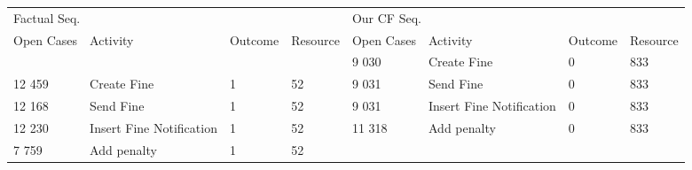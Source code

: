 \begin{tabular}{llllllll}
\toprule
\multicolumn{4}{l}{Factual Seq.} & \multicolumn{4}{l}{Our CF Seq.} \\
Open Cases & Activity & Outcome & Resource & Open Cases & Activity & Outcome & Resource \\
\midrule
 &  &  &  & 9 030 & Create Fine & 0 & 833 \\
12 459 & Create Fine & 1 & 52 & 9 031 & Send Fine & 0 & 833 \\
12 168 & Send Fine & 1 & 52 & 9 031 & Insert Fine Notification & 0 & 833 \\
12 230 & Insert Fine Notification & 1 & 52 & 11 318 & Add penalty & 0 & 833 \\
7 759 & Add penalty & 1 & 52 &  &  &  &  \\
\bottomrule
\end{tabular}
